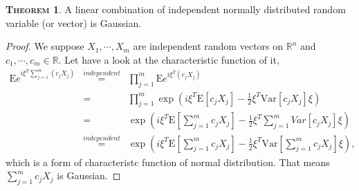 \documentclass[a4paper, twoside, 11pt]{article}
\theoremstyle{definition}
\newtheorem{theorem}[definition]{\scshape Theorem}
\newtheorem{corollary}[definition]{\scshape Corollary}
\newcommand{\brkt}[1]{\left({#1} \right)}
\begin{document}

  


\begin{theorem}
  A linear combination of independent normally distributed random variable (or vector) is Gaussian.
\end{theorem}

\begin{proof}
  We suppose $X_1, \cdots, X_m$ are independent random vectors  on $\mathbb{R}^n$ and $c_1, \cdots, c_m \in \mathbb{R}$. Let have a look at the characteristic function of it,
  \begin{eqnarray*}
	\mathrm{E}e^{i\xi^T\sum_{j=1}^m(c_jX_j)} &\overset{independent}{=}&\prod_{j=1}^{m} \mathrm{E}e^{i\xi^T(c_jX_j)}\\
	&=& \prod_{j=1}^m \exp\brkt{i\xi^T\mathrm{E}[c_jX_j]-\frac{1}{2}\xi^T\mathrm{Var}[c_jX_j]\xi}\\
	&=&  \exp\brkt{i\xi^T\mathrm{E}[\sum_{j=1}^{m}c_jX_j]-\frac{1}{2}\xi^T\mathrm\sum_{j=1}^{m}{Var}[c_jX_j]\xi}\\
	&\overset{independent}{=}&  \exp\brkt{i\xi^T\mathrm{E}[\sum_{j=1}^{m}c_jX_j]-\frac{1}{2}\xi^T\mathrm{Var}[\sum_{j=1}^{m}c_jX_j]\xi},
  \end{eqnarray*}
  which is a form of characteristc function of normal distribution. That means $\sum_{j=1}^m c_jX_j$ is Gaussian. 
\end{proof}
\end{document}
